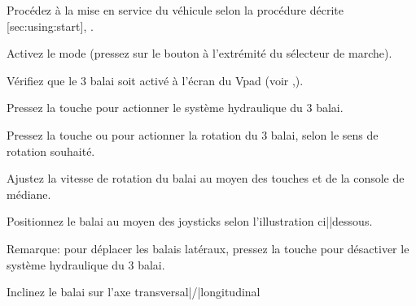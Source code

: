 \stopsection






\startsection [title={Travailler avec le troisième balai (option)},
							reference={sec:using:frontBrush},
							]

\startSteps
\item Procédez à la mise en service du véhicule selon la procédure décrite [sec:using:start], .
\item Activez le mode 
(pressez sur le bouton à l’extrémité du sélecteur de marche).
\stopSteps


\startSteps [continue]
\item Vérifiez que le 3 balai soit activé à l'écran du Vpad
(voir  ,).
\item Pressez la touche  pour actionner le système hydraulique du 3 balai.
\item Pressez la touche  ou  pour actionner la rotation du 3 balai, selon le sens de rotation souhaité.

\item Ajustez la vitesse de rotation du balai au moyen des touches 
et  de la console de médiane.

\item Positionnez le balai au moyen des joysticks selon l'illustration ci||dessous.

\stopSteps

{\md Remarque:} {\lt pour déplacer les balais latéraux, pressez la touche  pour désactiver le système hydraulique du 3 balai.}
\vfill

\start
\setupcombinations [width=\textwidth]

{
{}{Inclinez le balai sur l'axe transversal|/|longitudinal}
\stopcombination}
\stop



\stopsection


